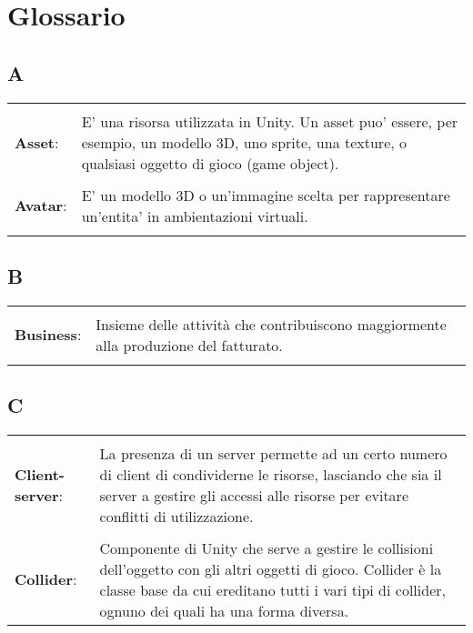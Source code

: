 \setcounter{secnumdepth}{0}
\section{Glossario}

\allsectionsfont{\raggedleft\huge}


\subsection{A}{
	\normalsize
	\begin{longtable}{p{} p{}} 
		\\
		\textbf{Asset}:		&	 E' una risorsa utilizzata in Unity. Un asset puo' essere, per esempio, un modello 3D, uno sprite, una texture, o qualsiasi oggetto di gioco (game object).\\
		\\
		\textbf{Avatar}:		&	 E' un modello 3D o un'immagine scelta per rappresentare un'entita' in ambientazioni virtuali.\\
	\end{longtable}



\subsection{B}{
	\normalsize
	\begin{longtable}{p{} p{}} 
		\\
		\textbf{Business}:		&	 Insieme delle attività che contribuiscono maggiormente alla produzione del fatturato.\\
	\end{longtable}

\subsection{C}{
	\normalsize
	\begin{longtable}{p{} p{}} 

		\\
		\textbf{Client-server}:		&	  La presenza di un server permette ad un certo numero di client di condividerne le risorse, lasciando che sia il server a gestire gli accessi alle risorse per evitare conflitti di utilizzazione.\\
		
		\\
		\textbf{Collider}:		&	 Componente di Unity che serve a gestire le collisioni dell'oggetto con gli altri oggetti di gioco. Collider è la classe base da cui ereditano tutti i vari tipi di collider, ognuno dei quali ha una forma diversa.\\
		

\end{longtable}}}}
